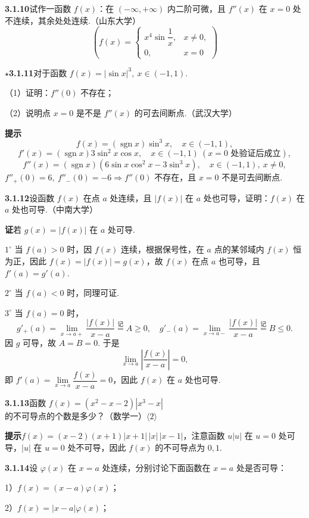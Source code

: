 \documentclass[UTF8, 12pt, fontset=fandol, oneside]{ctexart}
\begin{document}
\noindent\textbf{3.1.10}\quad 试作一函数 $f(x)$：在 $(-\infty,+\infty)$ 内二阶可微，且 $f''(x)$ 在 $x=0$ 处不连续，其余处处连续.（山东大学）
\[
  \left(f(x)=
\begin{cases}
x^4\sin\dfrac1x, & x\ne0,\\
0, & x=0
\end{cases}\right)
\]

\noindent\textbf{$\star$3.1.11}\quad 对于函数 $f(x)=|\sin x|^3,\ x\in(-1,1)$.

（1）证明：$f''(0)$ 不存在；

（2）说明点 $x=0$ 是不是 $f''(x)$ 的可去间断点.（武汉大学）

\noindent\textbf{提示}\quad
\[
  f(x)=(\operatorname{sgn}x)\sin^3x,\quad x\in(-1,1),
\]
\[
  f'(x)=(\operatorname{sgn}x)3\sin^2x\cos x,\quad x\in(-1,1)\ (x=0\text{ 处验证后成立}),
\]
\[
  f''(x)=(\operatorname{sgn}x)(6\sin x\cos^2x-3\sin^3x),\quad x\in(-1,1),\ x\ne0,
\]
$f''_+(0)=6,\ f''_-(0)=-6\Rightarrow f''(0)$ 不存在，且 $x=0$ 不是可去间断点.

\noindent\textbf{3.1.12}\quad 设函数 $f(x)$ 在点 $a$ 处连续，且 $|f(x)|$ 在 $a$ 处也可导，证明：$f(x)$ 在 $a$ 处也可导.（中南大学）

\noindent\textbf{证}\quad 若 $g(x)=|f(x)|$ 在 $a$ 处可导.

$1^\circ$ 当 $f(a)>0$ 时，因 $f(x)$ 连续，根据保号性，在 $a$ 点的某邻域内 $f(x)$ 恒为正，因此 $f(x)=|f(x)|=g(x)$，故 $f(x)$ 在点 $a$ 也可导，且 $f'(a)=g'(a)$.

$2^\circ$ 当 $f(a)<0$ 时，同理可证.

$3^\circ$ 当 $f(a)=0$ 时，
\[
  g'_+(a)=\lim_{x\to a+}\frac{|f(x)|}{x-a}\stackrel{\text{记}}{=}A\ge0,\quad
  g'_-(a)=\lim_{x\to a-}\frac{|f(x)|}{x-a}\stackrel{\text{记}}{=}B\le0.
\]
因 $g$ 可导，故 $A=B=0$. 于是
\[
  \lim_{x\to a}\left|\frac{f(x)}{x-a}\right|=0,
\]
即 $f'(a)=\lim\limits_{x\to a}\dfrac{f(x)}{x-a}=0$，因此 $f(x)$ 在 $a$ 处也可导.

\noindent\textbf{3.1.13}\quad 函数 $f(x)=(x^2-x-2)|x^3-x|$ 的不可导点的个数是多少？（数学一）\quad $\langle2\rangle$

\noindent\textbf{提示}\quad $f(x)=(x-2)(x+1)|x+1|\,|x|\,|x-1|$，注意函数 $u|u|$ 在 $u=0$ 处可导，$|u|$ 在 $u=0$ 处不可导，因此 $f(x)$ 的不可导点为 $0,1$.

\noindent\textbf{3.1.14}\quad 设 $\varphi(x)$ 在 $x=a$ 处连续，分别讨论下面函数在 $x=a$ 处是否可导：

1）$f(x)=(x-a)\varphi(x)$；

2）$f(x)=|x-a|\varphi(x)$；
\end{document}
